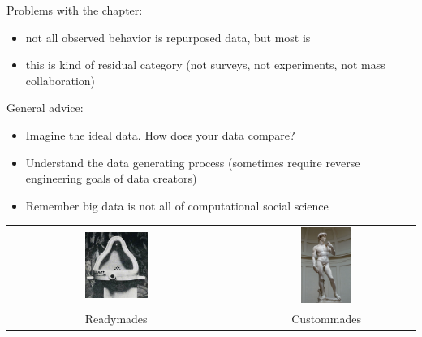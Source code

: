 \documentclass[aspectratio=169]{beamer}
\def\vf{\vfill}
\begin{document}
\begin{frame}

Problems with the chapter:
\begin{itemize}
\item not all observed behavior is repurposed data, but most is
\item this is kind of residual category (not surveys, not experiments, not mass collaboration)
\end{itemize}

\end{frame}
\begin{frame}

General advice:
\begin{itemize}
\item Imagine the ideal data.  How does your data compare?
\pause
\item Understand the data generating process (sometimes require reverse engineering goals of data creators)
\pause
\item Remember big data is not all of computational social science
\end{itemize}

\end{frame}
\begin{frame}

\begin{center}
\begin{tabular}{ccc}
\includegraphics[width=0.30\textwidth]{figures/duchamp_fountain} & \phantom{12345} & \includegraphics[width=0.30\textwidth]{figures/michelangelo_david} \\
\LARGE{Readymades} &  & \LARGE{Custommades}
\end{tabular}
\end{center}

\vf
\vspace{0.3in}
\\

\end{frame}
\end{document}
